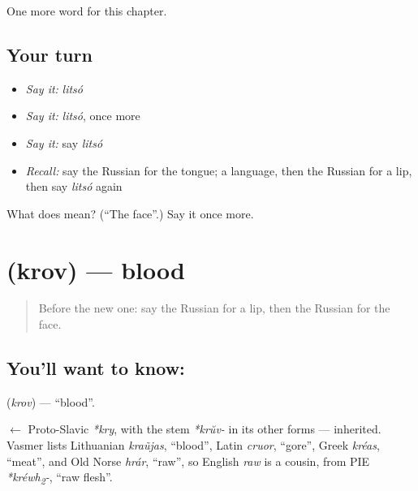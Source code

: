 \begin{grammarlens}[title={What you've built}]
One more word for this chapter.
\end{grammarlens}

\subsection*{Your turn}
\begin{itemize}
\raggedright
  \item \emph{Say it:} \emph{litsó}
  \item \emph{Say it:} \emph{litsó}, once more
  \item \emph{Say it:} say \emph{litsó}
  \item \emph{Recall:} say the Russian for the tongue; a language, then the Russian for a lip, then say \emph{litsó} again
\end{itemize}

\begin{tcolorbox}[breakable,colback=teal!4,colframe=teal!35!black,title={Before you move on}]
What does  mean? (\textquotedblleft{}The face\textquotedblright{}.) Say it once more.
\end{tcolorbox}
\section[\texorpdfstring{\ru{кровь} (krov)}{кровь (krov)}]{ (krov) — blood}

\label{lesson:RU-C31-blood}



\begin{quote}
Before the new one: say the Russian for a lip, then the Russian for the face.
\end{quote}

\subsection*{You'll want to know: }
\textbf{} (\emph{krov}) — \textquotedblleft{}blood\textquotedblright{}.

\begin{cousinweb}
\textbf{} $\leftarrow$ Proto-Slavic \emph{*kry}, with the stem \emph{*krŭv-} in its other forms — inherited. Vasmer lists Lithuanian \emph{kraũjas}, \textquotedblleft{}blood\textquotedblright{}, Latin \emph{cruor}, \textquotedblleft{}gore\textquotedblright{}, Greek \emph{kréas}, \textquotedblleft{}meat\textquotedblright{}, and Old Norse \emph{hrár}, \textquotedblleft{}raw\textquotedblright{}, so English \emph{raw} is a cousin, from PIE \emph{*kréwh\textsubscript{2}-}, \textquotedblleft{}raw flesh\textquotedblright{}.
\end{cousinweb}

